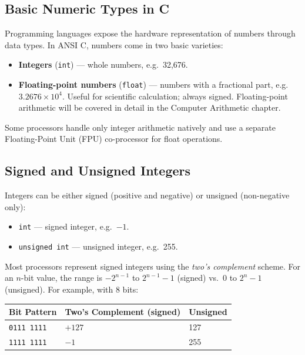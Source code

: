 \documentclass[11pt, a4paper, notitlepage]{report}
\theoremstyle{definition}
\theoremstyle{remark}
\theoremstyle{definition}
\begin{document}
\subsection{Basic Numeric Types in C}

Programming languages expose the hardware representation of numbers through data types. In ANSI C, numbers come in two basic varieties:

\begin{itemize}
  \item \textbf{Integers} (\texttt{int}) --- whole numbers, e.g.\ 32,676.
  \item \textbf{Floating-point numbers} (\texttt{float}) --- numbers with a fractional part, e.g.\ $3.2676 \times 10^4$. Useful for scientific calculation; always signed. Floating-point arithmetic will be covered in detail in the Computer Arithmetic chapter.
\end{itemize}

Some processors handle only integer arithmetic natively and use a separate Floating-Point Unit (FPU) co-processor for float operations.

\subsection{Signed and Unsigned Integers}

Integers can be either signed (positive and negative) or unsigned (non-negative only):

\begin{itemize}
  \item \texttt{int} --- signed integer, e.g.\ $-1$.
  \item \texttt{unsigned int} --- unsigned integer, e.g.\ 255.
\end{itemize}

Most processors represent signed integers using the \emph{two's complement} scheme. For an $n$-bit value, the range is $-2^{n-1}$ to $2^{n-1}-1$ (signed) vs.\ $0$ to $2^n - 1$ (unsigned). For example, with 8 bits:

\begin{center}
\begin{tabular}{lll}
\toprule
\textbf{Bit Pattern} & \textbf{Two's Complement (signed)} & \textbf{Unsigned} \\
\midrule
\texttt{0111 1111} & $+127$ & 127 \\
\texttt{1111 1111} & $-1$ & 255 \\
\bottomrule
\end{tabular}
\end{center}
\end{document}
